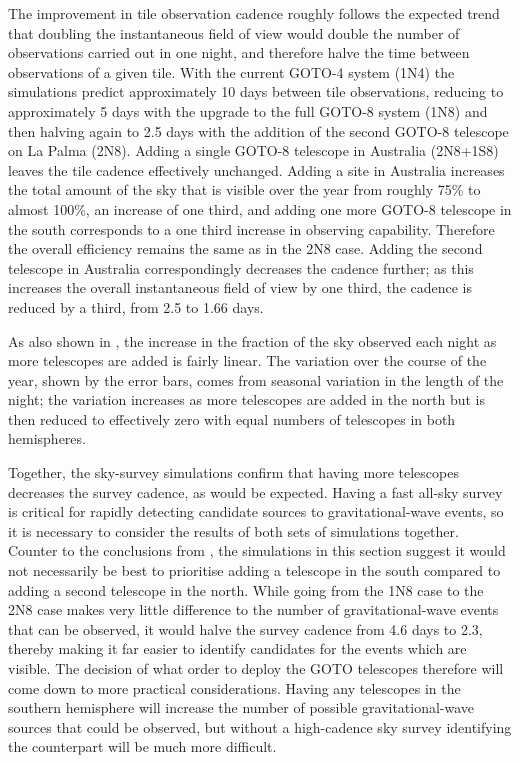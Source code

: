 \begin{colsection}
The improvement in tile observation cadence roughly follows the expected trend that doubling the instantaneous field of view would double the number of observations carried out in one night, and therefore halve the time between observations of a given tile. With the current GOTO-4 system (1N4) the simulations predict approximately 10 days between tile observations, reducing to approximately 5 days with the upgrade to the full GOTO-8 system (1N8) and then halving again to 2.5 days with the addition of the second GOTO-8 telescope on La Palma (2N8). Adding a single GOTO-8 telescope in Australia (2N8+1S8) leaves the tile cadence effectively unchanged. Adding a site in Australia increases the total amount of the sky that is visible over the year from roughly 75\% to almost 100\%, an increase of one third, and adding one more GOTO-8 telescope in the south corresponds to a one third increase in observing capability. Therefore the overall efficiency remains the same as in the 2N8 case. Adding the second telescope in Australia correspondingly decreases the cadence further; as this increases the overall instantaneous field of view by one third, the cadence is reduced by a third, from 2.5 to 1.66 days.

\newpage

As also shown in , the increase in the fraction of the sky observed each night as more telescopes are added is fairly linear. The variation over the course of the year, shown by the error bars, comes from seasonal variation in the length of the night; the variation increases as more telescopes are added in the north but is then reduced to effectively zero with equal numbers of telescopes in both hemispheres.

Together, the sky-survey simulations confirm that having more telescopes decreases the survey cadence, as would be expected. Having a fast all-sky survey is critical for rapidly detecting candidate sources to gravitational-wave events, so it is necessary to consider the results of both sets of simulations together. Counter to the conclusions from , the simulations in this section suggest it would not necessarily be best to prioritise adding a telescope in the south compared to adding a second telescope in the north. While going from the 1N8 case to the 2N8 case makes very little difference to the number of gravitational-wave events that can be observed, it would halve the survey cadence from 4.6 days to 2.3, thereby making it far easier to identify candidates for the events which are visible. The decision of what order to deploy the GOTO telescopes therefore will come down to more practical considerations. Having any telescopes in the southern hemisphere will increase the number of possible gravitational-wave sources that could be observed, but without a high-cadence sky survey identifying the counterpart will be much more difficult.


\end{colsection}
